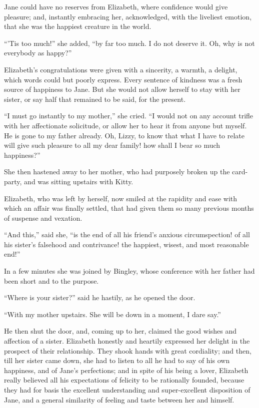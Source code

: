 Jane could have no reserves from Elizabeth, where confidence would give pleasure; and, instantly embracing her, acknowledged, with the liveliest emotion, that she was the happiest creature in the world.

``'Tis too much!'' she added, ``by far too much. I do not deserve it. Oh, why is not everybody as happy?''

Elizabeth's congratulations were given with a sincerity, a warmth, a delight, which words could but poorly express. Every sentence of kindness was a fresh source of happiness to Jane. But she would not allow herself to stay with her sister, or say half that remained to be said, for the present.

``I must go instantly to my mother,'' she cried. ``I would not on any account trifle with her affectionate solicitude, or allow her to hear it from anyone but myself. He is gone to my father already. Oh, Lizzy, to know that what I have to relate will give such pleasure to all my dear family! how shall I bear so much happiness?''

She then hastened away to her mother, who had purposely broken up the card-party, and was sitting upstairs with Kitty.

Elizabeth, who was left by herself, now smiled at the rapidity and ease with which an affair was finally settled, that had given them so many previous months of suspense and vexation.

``And this,'' said she, ``is the end of all his friend's anxious circumspection! of all his sister's falsehood and contrivance! the happiest, wisest, and most reasonable end!''

In a few minutes she was joined by Bingley, whose conference with her father had been short and to the purpose.

``Where is your sister?'' said he hastily, as he opened the door.

``With my mother upstairs. She will be down in a moment, I dare say.''

He then shut the door, and, coming up to her, claimed the good wishes and affection of a sister. Elizabeth honestly and heartily expressed her delight in the prospect of their relationship. They shook hands with great cordiality; and then, till her sister came down, she had to listen to all he had to say of his own happiness, and of Jane's perfections; and in spite of his being a lover, Elizabeth really believed all his expectations of felicity to be rationally founded, because they had for basis the excellent understanding and super-excellent disposition of Jane, and a general similarity of feeling and taste between her and himself.


